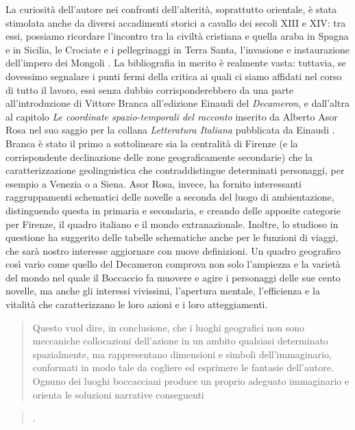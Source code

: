 La curiosità dell'autore nei confronti dell'alterità, soprattutto
orientale, è stata stimolata anche da diversi accadimenti storici a
cavallo dei secoli XIII e XIV: tra essi, possiamo ricordare l'incontro
tra la civiltà cristiana e quella araba in Spagna e in Sicilia, le
Crociate e i pellegrinaggi in Terra Santa, l'invasione e instaurazione
dell'impero dei Mongoli \autocite[p.~20]{morosini2010boccaccio}. La
bibliografia in merito è realmente vasta: tuttavia, se dovessimo
segnalare i punti fermi della critica ai quali ci siamo affidati nel
corso di tutto il lavoro, essi senza dubbio corrisponderebbero da una
parte all'introduzione di Vittore Branca all'edizione Einaudi del
\emph{Decameron}, e dall'altra al capitolo \emph{Le coordinate
spazio-temporali del racconto} inserito da Alberto Asor Rosa nel suo
saggio per la collana \emph{Letteratura Italiana} pubblicata da Einaudi
\autocite{asor1992}. Branca è stato il primo a sottolineare sia la
centralità di Firenze (e la corrispondente declinazione delle zone
geograficamente secondarie) che la caratterizzazione geolinguistica che
contraddistingue determinati personaggi, per esempio a Venezia o a
Siena. Asor Rosa, invece, ha fornito interessanti raggruppamenti
schematici delle novelle a seconda del luogo di ambientazione,
distinguendo questa in primaria e secondaria, e creando delle apposite
categorie per Firenze, il quadro italiano e il mondo extranazionale.
Inoltre, lo studioso in questione ha suggerito delle tabelle schematiche
anche per le funzioni di viaggi, che sarà nostro interesse aggiornare
con nuove definizioni. Un quadro geografico così vario come quello del
Decameron comprova non solo l'ampiezza e la varietà del mondo nel quale
il Boccaccio fa muovere e agire i personaggi delle sue cento novelle, ma
anche gli interessi vivissimi, l'apertura mentale, l'efficienza e la
vitalità che caratterizzano le loro azioni e i loro atteggiamenti.

\begin{quote}
Questo vuol dire, in conclusione, che i luoghi geografici non sono
meccaniche collocazioni dell'azione in un ambito qualsiasi determinato
spazialmente, ma rappresentano dimensioni e simboli dell'immaginario,
conformati in modo tale da cogliere ed esprimere le fantasie
dell'autore. Ognuno dei luoghi boccacciani produce un proprio adeguato
immaginario e orienta le soluzioni narrative conseguenti
\end{quote}

\begin{quote}
\autocite[p.~548]{asor1992}.
\end{quote}

